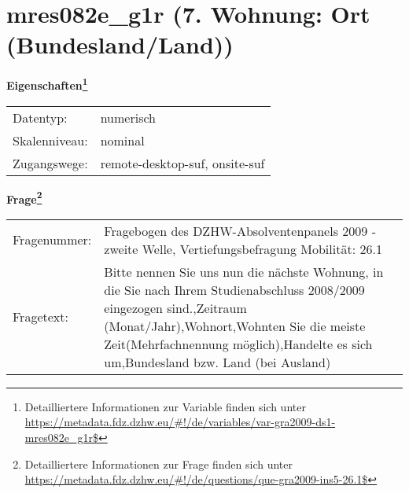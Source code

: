 
    \setcounter{footnote}{0}

    \vspace*{-1.8cm}
	\section{mres082e\_g1r (7. Wohnung: Ort (Bundesland/Land))}
	\label{section:mres082e_g1r}



    \vspace*{0.5cm}
    \noindent\textbf{Eigenschaften\footnote{Detailliertere Informationen zur Variable finden sich unter
		\url{https://metadata.fdz.dzhw.eu/\#!/de/variables/var-gra2009-ds1-mres082e_g1r$}}}\\
	\begin{tabularx}{\hsize}{@{}lX}
	Datentyp: & numerisch \\
	Skalenniveau: & nominal \\
	Zugangswege: &
	  remote-desktop-suf, 
	  onsite-suf
 \\
    \end{tabularx}



				\vspace*{0.5cm}
                \noindent\textbf{Frage\footnote{Detailliertere Informationen zur Frage finden sich unter
		              \url{https://metadata.fdz.dzhw.eu/\#!/de/questions/que-gra2009-ins5-26.1$}}}\\
				\begin{tabularx}{\hsize}{@{}lX}
					Fragenummer: &
					  Fragebogen des DZHW-Absolventenpanels 2009 - zweite Welle, Vertiefungsbefragung Mobilität:
					  26.1
 \\
					Fragetext: & Bitte nennen Sie uns nun die nächste Wohnung, in die Sie nach Ihrem Studienabschluss 2008/2009 eingezogen sind.,Zeitraum (Monat/Jahr),Wohnort,Wohnten Sie die meiste Zeit(Mehrfachnennung möglich),Handelte es sich um,Bundesland bzw. Land (bei Ausland) \\
				\end{tabularx}





